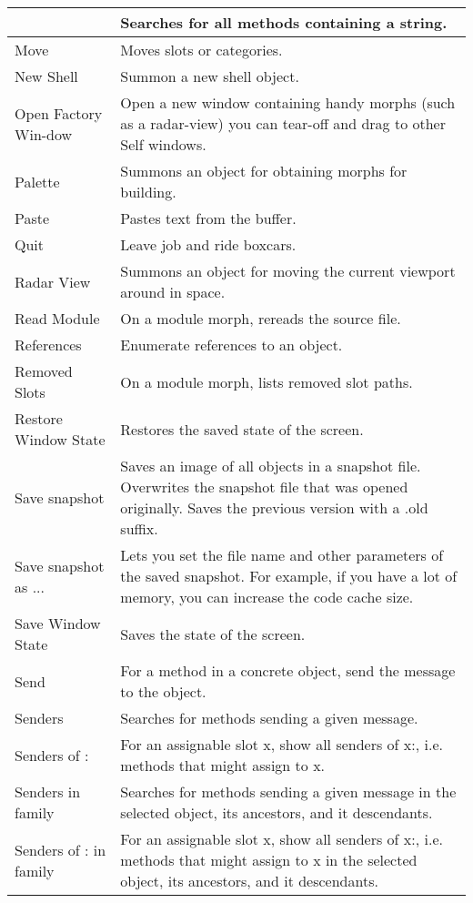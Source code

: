 \documentclass[letterpaper,10pt,english]{sphinxmanual}
\begin{document}
\begin{longtable}{p{5cm} p{10cm}}
&
Searches for all methods containing a string.
\\
\hline
Move
&
Moves slots or categories.
\\
\hline
New Shell
&
Summon a new shell object.
\\
\hline
Open Factory Win-dow
&
Open a new window containing handy morphs (such as a radar-view) you can tear-off and drag to other Self windows.
\\
\hline
Palette
&
Summons an object for obtaining morphs for building.
\\
\hline
Paste
&
Pastes text from the buffer.
\\
\hline
Quit
&
Leave job and ride boxcars.
\\
\hline
Radar View
&
Summons an object for moving the current viewport around in space.
\\
\hline
Read Module
&
On a module morph, rereads the source file.
\\
\hline
References
&
Enumerate references to an object.
\\
\hline
Removed Slots
&
On a module morph, lists removed slot paths.
\\
\hline
Restore Window State
&
Restores the saved state of the screen.
\\
\hline
Save snapshot
&
Saves an image of all objects in a snapshot file. Overwrites the snapshot file that was opened originally. Saves the previous version with a \sphinxquotedblright{}.old\sphinxquotedblright{} suffix.
\\
\hline
Save snapshot as ...
&
Lets you set the file name and other parameters of the saved snapshot. For example, if you have a lot of memory, you can increase the code cache size.
\\
\hline
Save Window State
&
Saves the state of the screen.
\\
\hline
Send
&
For a method in a concrete object, send the message to the object.
\\
\hline
Senders
&
Searches for methods sending a given message.
\\
\hline
Senders of :
&
For an assignable slot x, show all senders of x:, i.e. methods that might assign to x.
\\
\hline
Senders in family
&
Searches for methods sending a given message in the selected object, its ancestors, and it descendants.
\\
\hline
Senders of : in family
&
For an assignable slot x, show all senders of x:, i.e. methods that might assign to x in the selected object, its ancestors, and it descendants.

\end{longtable}
\end{document}
